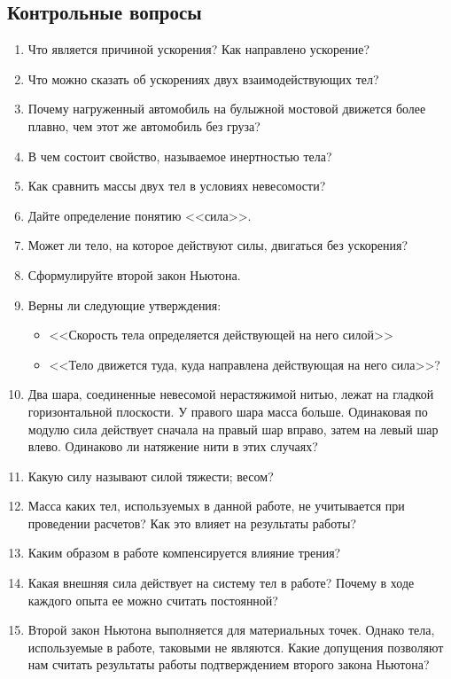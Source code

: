 \documentclass[a4paper, 12pt]{extarticle}
\begin{document}
\subsection{Контрольные вопросы}
\begin{enumerate}
\item Что является причиной ускорения? Как направлено ускорение?
\item Что можно сказать об ускорениях двух взаимодействующих тел?
\item Почему нагруженный автомобиль на булыжной мостовой движется более плавно, чем этот же автомобиль без груза?
\item В чем состоит свойство, называемое инертностью тела?
\item Как сравнить массы двух тел в условиях невесомости?
\item Дайте определение понятию <<сила>>.
\item Может ли тело, на которое действуют силы, двигаться без ускорения?
\item Сформулируйте второй закон Ньютона.
\item Верны ли следующие утверждения:
	\begin{itemize}
	\item <<Скорость тела определяется действующей на него силой>>
	\item <<Тело движется туда, куда направлена действующая на него сила>>?
	\end{itemize}
\item Два шара, соединенные невесомой нерастяжимой нитью, лежат на гладкой горизонтальной плоскости. У правого шара масса больше. Одинаковая по модулю сила действует сначала на правый шар вправо, затем на левый шар влево. Одинаково ли натяжение нити в этих случаях?
\item Какую силу называют силой тяжести; весом?
\item Масса каких тел, используемых в данной работе, не учитывается при проведении расчетов? Как это влияет на результаты работы?
\item Каким образом в работе компенсируется влияние трения?
\item Какая внешняя сила действует на систему тел в работе? Почему в ходе каждого опыта ее можно считать постоянной?
\item Второй закон Ньютона выполняется для материальных точек. Однако тела, используемые в работе, таковыми не являются. Какие допущения позволяют нам считать результаты работы подтверждением второго закона Ньютона? %
\end{enumerate}
\end{document}
